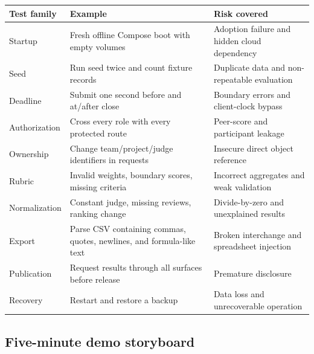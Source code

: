 \documentclass[11pt]{article}
\begin{document}
\begin{longtable}{@{}L{37mm}L{52mm}L{69mm}@{}}
\toprule
\textbf{Test family} & \textbf{Example} & \textbf{Risk covered}\\
\midrule
\endhead%
Startup & Fresh offline Compose boot with empty volumes & Adoption failure and hidden cloud dependency\\
Seed & Run seed twice and count fixture records & Duplicate data and non-repeatable evaluation\\
Deadline & Submit one second before and at/after close & Boundary errors and client-clock bypass\\
Authorization & Cross every role with every protected route & Peer-score and participant leakage\\
Ownership & Change team/project/judge identifiers in requests & Insecure direct object reference\\
Rubric & Invalid weights, boundary scores, missing criteria & Incorrect aggregates and weak validation\\
Normalization & Constant judge, missing reviews, ranking change & Divide-by-zero and unexplained results\\
Export & Parse CSV containing commas, quotes, newlines, and formula-like text & Broken interchange and spreadsheet injection\\
Publication & Request results through all surfaces before release & Premature disclosure\\
Recovery & Restart and restore a backup & Data loss and unrecoverable operation\\
\bottomrule
\end{longtable}

\subsection{Five-minute demo storyboard}
\end{document}
